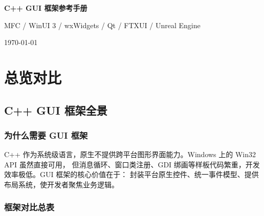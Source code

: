 \documentclass[12pt,a4paper,fontset=fandol]{ctexbook}
\begin{document}
\frontmatter

\begin{titlepage}
\centering
\vspace*{4cm}
{\Huge\bfseries C++ GUI 框架参考手册\par}
\vspace{1cm}
{\LARGE MFC / WinUI 3 / wxWidgets / Qt / FTXUI / Unreal Engine\par}
\vfill
{\large \today\par}
\end{titlepage}

\tableofcontents

\mainmatter

\part{总览对比}

\chapter{C++ GUI 框架全景}

\section{为什么需要 GUI 框架}

C++ 作为系统级语言，原生不提供跨平台图形界面能力。Windows 上的 Win32 API 虽然直接可用，
但消息循环、窗口类注册、GDI 绑画等样板代码繁重，开发效率极低。GUI 框架的核心价值在于：
封装平台原生控件、统一事件模型、提供布局系统，使开发者聚焦业务逻辑。

\section{框架对比总表}
\end{document}
